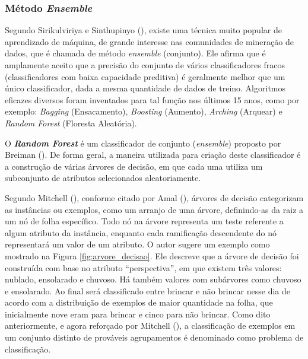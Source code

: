 \subsubsection{Método \textit{Ensemble}}
\label{ensemble}
Segundo Sirikulviriya e Sinthupinyo (\citeyear{SirikulviriyaIntegrationOR}), existe uma técnica muito popular de aprendizado de máquina, de grande interesse nas comunidades de mineração de dados, que é chamada de método \textit{ensemble} (conjunto). Ele afirma que é amplamente aceito que a precisão do conjunto de vários classificadores fracos (classificadores com baixa capacidade preditiva) é geralmente melhor que um único classificador, dada a mesma quantidade de dados de treino. Algoritmos eficazes diversos foram inventados para tal função nos últimos 15 anos, como por exemplo: \textit{Bagging} (Ensacamento), \textit{Boosting} (Aumento), \textit{Arching} (Arquear) e \textit{Random Forest} (Floresta Aleatória).

O \textbf{\textit{Random Forest}} é um classificador de conjunto (\textit{ensemble}) proposto por Breiman (\citeyear{Breiman:2001:RF:570181.570182}). De forma geral, a maneira utilizada para criação deste classificador é a construção de várias árvores de decisão, em que cada uma utiliza um subconjunto de atributos selecionados aleatoriamente.

Segundo Mitchell (\citeyear{Mitchell:1997:ML:541177}), conforme citado por Amal (\citeyear{Amal}), árvores de decisão categorizam as instâncias ou exemplos, como um arranjo de uma árvore, definindo-as da raiz a um nó de folha específico. Todo nó na árvore representa um teste referente a algum atributo da instância, enquanto cada ramificação descendente do nó representará um valor de um atributo. O autor sugere um exemplo como mostrado na Figura \ref{fig:arvore_decisao}. Ele descreve que a árvore de decisão foi construída com base no atributo “perspectiva”, em que existem três valores: nublado, ensolarado e chuvoso. Há também valores com subárvores como chuvoso e ensolarado. Ao final será classificado entre brincar e não brincar nesse dia de acordo com a distribuição de exemplos de maior quantidade na folha, que inicialmente nove eram para brincar e cinco para não brincar. Como dito anteriormente, e agora reforçado por Mitchell (\citeyear{Mitchell:1997:ML:541177}), a classificação de exemplos em um conjunto distinto de prováveis agrupamentos é denominado como problema de classificação.

